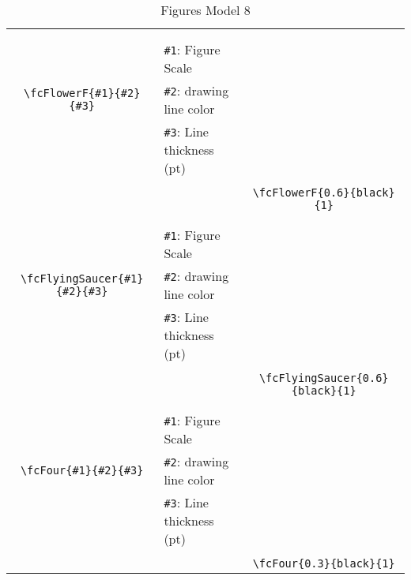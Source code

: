 \documentclass{article}
\begin{document}
\begin{table}[H]
\begin{tabular}{|c|l|c|}
	&&\multirow{5}{*}{\fcFlowerF{0.6}{black}{1}}\\	&&\\	&\verb|#1|: Figure Scale &\\	\verb|\fcFlowerF{#1}{#2}{#3}|&	\verb|#2|: drawing line color &\\	&\verb|#3|: Line thickness (pt) &\\ &&\\&&	\verb|\fcFlowerF{0.6}{black}{1}|\\\hline 	
	&&\multirow{5}{*}{\fcFlyingSaucer{0.6}{black}{1}}\\	&&\\	&\verb|#1|: Figure Scale &\\	\verb|\fcFlyingSaucer{#1}{#2}{#3}|&	\verb|#2|: drawing line color &\\	&\verb|#3|: Line thickness (pt) &\\ &&\\&&	\verb|\fcFlyingSaucer{0.6}{black}{1}|\\\hline 	
	&&\multirow{5}{*}{\fcFour{0.3}{black}{1}}\\	&&\\	&\verb|#1|: Figure Scale &\\	\verb|\fcFour{#1}{#2}{#3}|&	\verb|#2|: drawing line color &\\	&\verb|#3|: Line thickness (pt) &\\ &&\\&&	\verb|\fcFour{0.3}{black}{1}|\\\hline 	\hline\end{tabular}\caption{Figures Model 8}\label{tab8}\end{table}
\end{document}
